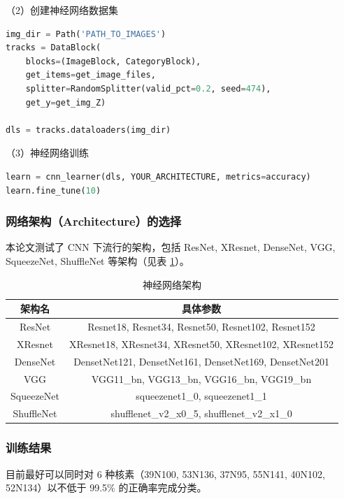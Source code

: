 \documentclass[AutoFakeBold]{LZUThesis}
\begin{document}
（2）创建神经网络数据集
\begin{lstlisting}[language = python]
img_dir = Path('PATH_TO_IMAGES')
tracks = DataBlock(
    blocks=(ImageBlock, CategoryBlock),
    get_items=get_image_files, 
    splitter=RandomSplitter(valid_pct=0.2, seed=474),
    get_y=get_img_Z)

dls = tracks.dataloaders(img_dir)
\end{lstlisting}


（3）神经网络训练
\begin{lstlisting}[language = python]
learn = cnn_learner(dls, YOUR_ARCHITECTURE, metrics=accuracy)
learn.fine_tune(10)
\end{lstlisting}




\subsubsection{网络架构（Architecture）的选择}
本论文测试了 CNN 下流行的架构，包括 ResNet, XResnet, DenseNet, VGG, SqueezeNet, ShuffleNet 等架构（见表 \ref{tbl_architectures}）。


\begin{table}[H]
    \centering
    \caption{神经网络架构}
    \begin{tabular}{cc} %
    \toprule
    架构名 & 具体参数 \\
    \midrule
    ResNet & Resnet18, Resnet34, Resnet50, Resnet102, Resnet152 \\
    XResnet & XResnet18, XResnet34, XResnet50, XResnet102, XResnet152 \\
    DenseNet & DensetNet121, DensetNet161, DensetNet169, DensetNet201 \\
    VGG & VGG11\_bn, VGG13\_bn, VGG16\_bn, VGG19\_bn \\
    SqueezeNet & squeezenet1\_0, squeezenet1\_1 \\
    ShuffleNet & shufflenet\_v2\_x0\_5, shufflenet\_v2\_x1\_0 \\
    \bottomrule
    \end{tabular}
    \label{tbl_architectures}
\end{table}



\subsubsection{训练结果}
目前最好可以同时对 6 种核素（39N100, 53N136, 37N95, 55N141, 40N102, 52N134）以不低于 99.5\% 的正确率完成分类。
\end{document}
